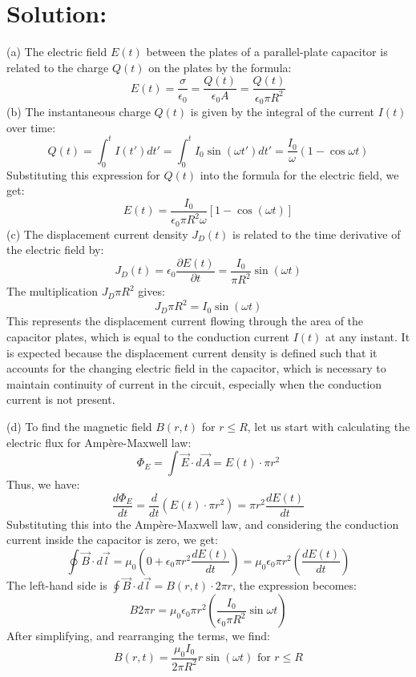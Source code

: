 \section*{Solution:}

\begin{solution}
(a) The electric field $E(t)$ between the plates of a parallel-plate capacitor is related to the charge $Q(t)$ on the plates by the formula:
\[
\boxed{
E(t) = \frac{\sigma}{\epsilon_0} = \frac{Q(t)}{\epsilon_0 A}= \frac{Q(t)}{\epsilon_0 \pi R^2}
}
\]
\noindent
(b) The instantaneous charge $Q(t)$ is given by the integral of the current $I(t)$ over time:
\[Q(t) = \int_0^t I(t') dt' = \int_0^t I_0 \sin(\omega t') dt' = \frac{I_0}{\omega} \left(1 - \cos\omega t\right)\]
Substituting this expression for $Q(t)$ into the formula for the electric field, we get:
\[
\boxed{
E(t) = \frac{I_0}{\epsilon_0 \pi R^2 \omega} \left[1 - \cos(\omega t)\right]
}
\]
\noindent
(c) The displacement current density $J_D(t)$ is related to the time derivative of the electric field by:
\[
\boxed{
J_D(t) = \epsilon_0 \frac{\partial E(t)}{\partial t}=\frac{I_0}{\pi R^2} \sin(\omega t)
}
\]
The multiplication $J_D \pi R^2$ gives:
\[J_D \pi R^2 = I_0 \sin(\omega t)\]
This represents the displacement current flowing through the area of the capacitor plates, which is equal to the conduction current $I(t)$ at any instant. It is expected because the displacement current density is defined such that it accounts for the changing electric field in the capacitor, which is necessary to maintain continuity of current in the circuit, especially when the conduction current is not present.

\noindent
(d) To find the magnetic field $B(r,t)$ for $r \leq R$, let us start with calculating the electric flux for Ampère-Maxwell law:
\[
\Phi_E = \int \vec{E} \cdot d\vec{A} = E(t) \cdot \pi r^2
\]
Thus, we have:
\[
\frac{d\Phi_E}{dt} = \frac{d}{dt} \left( E(t) \cdot \pi r^2 \right) = \pi r^2 \frac{dE(t)}{dt}
\]
Substituting this into the Ampère-Maxwell law, and considering the conduction current inside the capacitor is zero, we get:
\[
\oint \vec{B} \cdot d\vec{l} = \mu_0 \left( 0 + \epsilon_0 \pi r^2 \frac{dE(t)}{dt} \right) = \mu_0 \epsilon_0 \pi r^2 \left(\frac{dE(t)}{dt}\right)
\]
The left-hand side is $\oint \vec{B} \cdot d\vec{l} = B(r,t) \cdot 2\pi r$, the expression becomes:
\[B 2 \pi r = \mu_0 \epsilon_0 \pi r^2 \left( \frac{I_0}{\epsilon_0\pi R^2}\sin\omega t\right)\]
After simplifying, and rearranging the terms, we find:
\[\boxed{
B(r,t) = \frac{\mu_0 I_0}{2\pi R^2} r \sin(\omega t) \text{ for } r \leq R
}\]
\end{solution}
